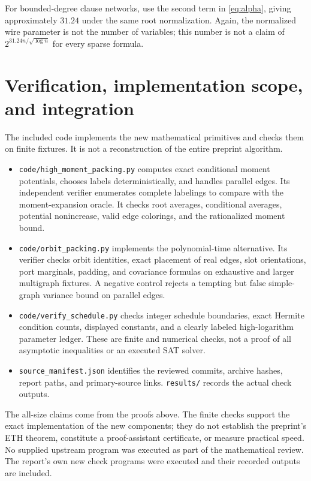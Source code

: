 \documentclass[11pt]{article}
\theoremstyle{remark}\newtheorem{remark}[theorem]{Remark}
\begin{document}
For bounded-degree clause networks, use the second term in \eqref{eq:alpha}, giving approximately $31.24$ under the same root normalization. Again, the normalized wire parameter is not the number of variables; this number is not a claim of $2^{31.24n/\sqrt{\log n}}$ for every sparse formula.

\section{Verification, implementation scope, and integration}
\label{sec:verification}

The included code implements the new mathematical primitives and checks them on finite fixtures. It is not a reconstruction of the entire preprint algorithm.

\begin{itemize}[leftmargin=*]
\item \texttt{code/high\_moment\_packing.py} computes exact conditional moment potentials, chooses labels deterministically, and handles parallel edges. Its independent verifier enumerates complete labelings to compare with the moment-expansion oracle. It checks root averages, conditional averages, potential nonincrease, valid edge colorings, and the rationalized moment bound.
\item \texttt{code/orbit\_packing.py} implements the polynomial-time alternative. Its verifier checks orbit identities, exact placement of real edges, slot orientations, port marginals, padding, and covariance formulas on exhaustive and larger multigraph fixtures. A negative control rejects a tempting but false simple-graph variance bound on parallel edges.
\item \texttt{code/verify\_schedule.py} checks integer schedule boundaries, exact Hermite condition counts, displayed constants, and a clearly labeled high-logarithm parameter ledger. These are finite and numerical checks, not a proof of all asymptotic inequalities or an executed SAT solver.
\item \texttt{source\_manifest.json} identifies the reviewed commits, archive hashes, report paths, and primary-source links. \texttt{results/} records the actual check outputs.
\end{itemize}

The all-size claims come from the proofs above. The finite checks support the exact implementation of the new components; they do not establish the preprint's ETH theorem, constitute a proof-assistant certificate, or measure practical speed. No supplied upstream program was executed as part of the mathematical review. The report's own new check programs were executed and their recorded outputs are included.
\end{document}
